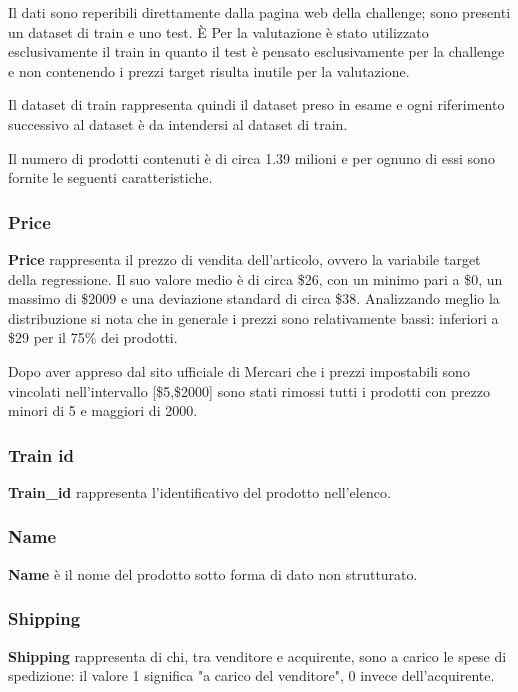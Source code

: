 
Il dati sono reperibili direttamente dalla pagina web della challenge; sono
presenti un dataset di train e uno test. È Per la valutazione è stato utilizzato
esclusivamente il train in quanto il test è pensato esclusivamente per la
challenge e non contenendo i prezzi target risulta inutile per la valutazione.

Il dataset di train rappresenta quindi il dataset preso in esame e ogni
riferimento successivo al dataset è da intendersi al dataset di train.

Il numero di prodotti contenuti è di circa 1.39 milioni e per ognuno di essi
sono fornite le seguenti caratteristiche.

\subsubsection{Price}
\textbf{Price} rappresenta il prezzo di vendita dell'articolo, ovvero la
variabile target della regressione. Il suo valore medio è di circa \$26, con un
minimo pari a \$0, un massimo di \$2009 e una deviazione standard di circa \$38.
Analizzando meglio la distribuzione si nota che in generale i prezzi sono
relativamente bassi: inferiori a \$29 per il 75\% dei prodotti.

Dopo aver appreso dal sito ufficiale di Mercari che i prezzi impostabili sono
vincolati nell'intervallo [\$5,\$2000] sono stati rimossi tutti i prodotti con prezzo minori di 5 e maggiori di 2000.
\subsubsection{Train id}
\textbf{Train\_id} rappresenta l'identificativo del prodotto nell'elenco.
\subsubsection{Name}
\textbf{Name} è il nome del prodotto sotto forma di dato non strutturato.
\subsubsection{Shipping}
\textbf{Shipping} rappresenta di chi, tra venditore e acquirente, sono a carico
le spese di spedizione: il valore 1 significa "a carico del
venditore", 0 invece dell'acquirente.

